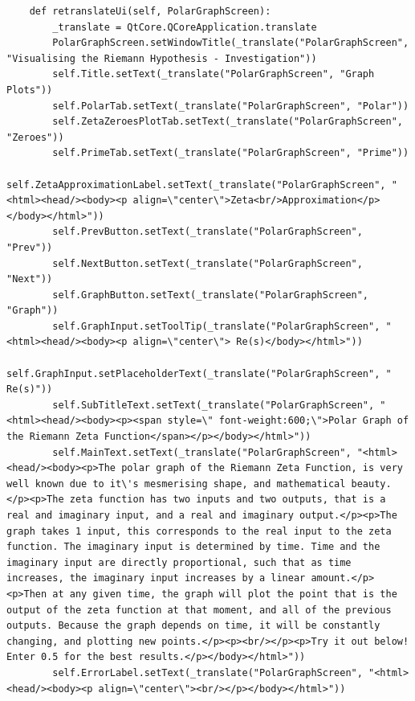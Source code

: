 \documentclass[12pt]{article}
\begin{document}
\begin{lstlisting}
    def retranslateUi(self, PolarGraphScreen):
        _translate = QtCore.QCoreApplication.translate
        PolarGraphScreen.setWindowTitle(_translate("PolarGraphScreen", "Visualising the Riemann Hypothesis - Investigation"))
        self.Title.setText(_translate("PolarGraphScreen", "Graph Plots"))
        self.PolarTab.setText(_translate("PolarGraphScreen", "Polar"))
        self.ZetaZeroesPlotTab.setText(_translate("PolarGraphScreen", "Zeroes"))
        self.PrimeTab.setText(_translate("PolarGraphScreen", "Prime"))
        self.ZetaApproximationLabel.setText(_translate("PolarGraphScreen", "<html><head/><body><p align=\"center\">Zeta<br/>Approximation</p></body></html>"))
        self.PrevButton.setText(_translate("PolarGraphScreen", "Prev"))
        self.NextButton.setText(_translate("PolarGraphScreen", "Next"))
        self.GraphButton.setText(_translate("PolarGraphScreen", "Graph"))
        self.GraphInput.setToolTip(_translate("PolarGraphScreen", "<html><head/><body><p align=\"center\"> Re(s)</body></html>"))
        self.GraphInput.setPlaceholderText(_translate("PolarGraphScreen", "          Re(s)"))
        self.SubTitleText.setText(_translate("PolarGraphScreen", "<html><head/><body><p><span style=\" font-weight:600;\">Polar Graph of the Riemann Zeta Function</span></p></body></html>"))
        self.MainText.setText(_translate("PolarGraphScreen", "<html><head/><body><p>The polar graph of the Riemann Zeta Function, is very well known due to it\'s mesmerising shape, and mathematical beauty.</p><p>The zeta function has two inputs and two outputs, that is a real and imaginary input, and a real and imaginary output.</p><p>The graph takes 1 input, this corresponds to the real input to the zeta function. The imaginary input is determined by time. Time and the imaginary input are directly proportional, such that as time increases, the imaginary input increases by a linear amount.</p><p>Then at any given time, the graph will plot the point that is the output of the zeta function at that moment, and all of the previous outputs. Because the graph depends on time, it will be constantly changing, and plotting new points.</p><p><br/></p><p>Try it out below! Enter 0.5 for the best results.</p></body></html>"))
        self.ErrorLabel.setText(_translate("PolarGraphScreen", "<html><head/><body><p align=\"center\"><br/></p></body></html>"))
\end{lstlisting}
\end{document}
